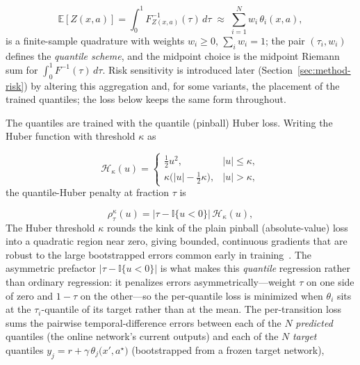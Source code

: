 \documentclass[conference]{IEEEtran}
\begin{document}
\begin{equation}
\mathbb{E}[Z(x,a)] = \int_0^1 F^{-1}_{Z(x,a)}(\tau)\,d\tau
\;\approx\; \sum_{i=1}^{N} w_i\,\theta_i(x,a),
\label{eq:expectation}
\end{equation}
is a finite-sample quadrature with weights $w_i\ge 0$, $\sum_i w_i = 1$; the pair
$(\tau_i,w_i)$ defines the \emph{quantile scheme}, and the midpoint choice is the
midpoint Riemann sum for $\int_0^1 F^{-1}(\tau)\,d\tau$. Risk sensitivity is
introduced later (Section~\ref{sec:method-risk}) by altering this aggregation
and, for some variants, the placement of the trained quantiles; the loss below
keeps the same form throughout.

The quantiles are trained with the quantile (pinball) Huber loss. Writing the
Huber function with threshold $\kappa$ as

\begin{equation}
\mathcal{H}_\kappa(u) =
\begin{cases}
\tfrac12 u^2, & |u|\le\kappa,\\[2pt]
\kappa\big(|u|-\tfrac12\kappa\big), & |u|>\kappa,
\end{cases}
\end{equation}
the quantile-Huber penalty at fraction $\tau$ is

\begin{equation}
\rho^\kappa_\tau(u) = \big|\tau - \mathbb{I}\{u<0\}\big|\,
\mathcal{H}_\kappa(u),
\label{eq:pinball}
\end{equation}
The Huber threshold $\kappa$ rounds the kink of the plain pinball
(absolute-value) loss into a quadratic region near zero, giving bounded,
continuous gradients that are robust to the large bootstrapped errors common
early in training~\cite{qrdqn}. The asymmetric prefactor
$|\tau-\mathbb{I}\{u<0\}|$ is what makes this \emph{quantile} regression rather
than ordinary regression: it penalizes errors asymmetrically---weight $\tau$ on
one side of zero and $1-\tau$ on the other---so the per-quantile loss is minimized
when $\theta_i$ sits at the $\tau_i$-quantile of its target rather than at the
mean.
The per-transition loss sums the pairwise temporal-difference errors between
each of the $N$ \emph{predicted} quantiles (the online network's current outputs)
and each of the $N$ \emph{target} quantiles
$y_j = r + \gamma\,\theta_j\!\big(x',a^\star\big)$ (bootstrapped from a frozen
target network),
\end{document}
